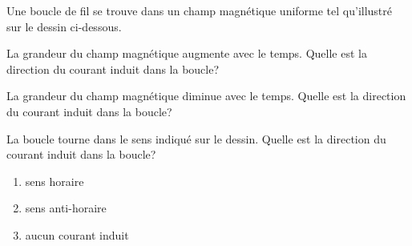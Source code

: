\begin{diapobox}


  Une boucle de fil se trouve dans un champ magnétique uniforme tel qu'illustré
  sur le dessin ci-dessous.

  La grandeur du champ magnétique augmente avec le temps. Quelle est la
  direction du courant induit dans la boucle?

  La grandeur du champ magnétique diminue avec le temps. Quelle est la
  direction du courant induit dans la boucle?

  La boucle tourne dans le sens indiqué sur le dessin. Quelle est la direction
  du courant induit dans la boucle?

  \begin{enumerate}
    \item sens horaire
    \item sens anti-horaire
    \item aucun courant induit
  \end{enumerate}

\end{diapobox}


